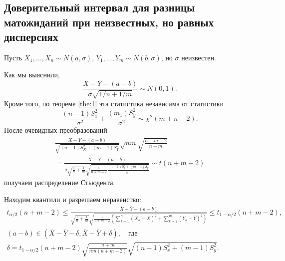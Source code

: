\subsection{Доверительный интервал для разницы матожиданий при неизвестных, но равных дисперсиях}
\begin{ex}[для $\Delta a$ при неизвестном $ \sigma_1 = \sigma_2 $]
Пусть $X_1, \dots, X_n \sim N(a, \sigma)$, $Y_1, \dots, Y_m \sim N(b, \sigma)$,
но $\sigma$ неизвестен.

Как мы выяснили,
\[
  \frac{\bar X - \bar Y - (a-b)}{\sigma \sqrt{1/n + 1/m}} \sim N(0, 1).
\]
Кроме того, по теореме \ref{the:1} эта статистика независима от статистики
\[
	\frac{(n-1)S_x^2}{\sigma^2} + \frac{(m_1) S_y^2}{\sigma^2} \sim \chi^2(m+n-2).
\]
После очевидных преобразований 
\begin{multline*}
	\frac{\bar X - \bar Y - (a-b)}{\sqrt{(n-1)S^2_X+(m-1)S^2_Y}} \sqrt{nm}
	\sqrt{\frac{n+m -2}{n+m}}= \\ =
	\frac{\bar X - \bar Y - (a-b)}{\sigma\sqrt{\frac1n + \frac1m}
	\sqrt{\frac{1}{n+m-2} \frac{(n-1) S_x^2 + (m-1)S_y^2}{\sigma^2}}} \sim
	t(n+m-2)
\end{multline*}
получаем распределение Стьюдента.

Находим квантили и разрешаем неравенство:
\begin{gather*}
	t_{\alpha/2}(n+m-2) \leqslant \frac{\bar X - \bar Y - (a-b)}{\sqrt{
	\frac{1}{n}+ \frac{1}{m}} \sqrt{ \frac{1}{n+m - 2} \left( \sum_{k=1}^n \left(
X_k - \bar X\right)^2 + \sum_{k=1}^m \left( Y_k - \bar Y \right)^2 \right)} }
\leqslant t_{1-\alpha/2} (n+m-2),\\
	(a-b) \in (\bar X - \bar Y - \delta, \bar X - \bar Y + \delta), \quad
	\text{где}\\
\delta = t_{1-\alpha/2} (n+m-2) \sqrt{\frac{n+m}{nm(n+m-2)}} \sqrt{(n-1)S_x^2 +
(m-1) S_y^2}.
\end{gather*}
\end{ex}

